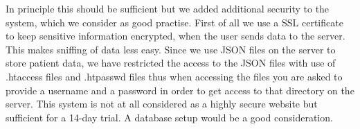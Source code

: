 In principle this should be sufficient but we added additional security to the system, which we consider as good practise. First of all we use a SSL certificate to keep sensitive information encrypted, when the user sends data to the server. This makes sniffing of data less easy. Since we use JSON files on the server to store patient data, we have restricted the access to the JSON files with use of .htaccess files and .htpasswd files thus when accessing the files you are asked to provide a username and a password in order to get access to that directory on the server. This system is not at all considered as a highly secure website but sufficient for a 14-day trial. A database setup would be a good consideration.